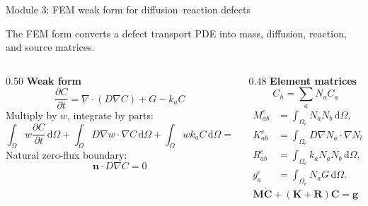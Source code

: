\documentclass[aspectratio=169,9pt]{beamer}
\newcommand{\dd}{\,\mathrm{d}}
\newcommand{\grad}{\nabla}
\newcommand{\divg}{\nabla\!\cdot}
\newcommand{\vect}[1]{\bm{#1}}
\newcommand{\mat}[1]{\mathbf{#1}}
\begin{document}
\begin{frame}{Module 3: FEM weak form for diffusion--reaction defects}
\footnotesize
\vspace{-3mm}
\begin{bluebox}
\centering
The FEM form converts a defect transport PDE into mass, diffusion, reaction, and source matrices.
\end{bluebox}

\vspace{1mm}
\begin{columns}[T,totalwidth=\textwidth]
\begin{column}{0.50\textwidth}
\textbf{Weak form}
\begin{equation*}
\frac{\partial C}{\partial t}=\divg(D\grad C)+G-k_aC
\end{equation*}
Multiply by \(w\), integrate by parts:
\begin{equation*}
\boxed{\int_\Omega w\frac{\partial C}{\partial t}\dd\Omega
+\int_\Omega D\grad w\cdot\grad C\dd\Omega
+\int_\Omega wk_aC\dd\Omega
=\int_\Omega wG\dd\Omega}
\end{equation*}
Natural zero-flux boundary:
\begin{equation*}
\boxed{\vect{n}\cdot D\grad C=0}
\end{equation*}
\end{column}
\begin{column}{0.48\textwidth}
\textbf{Element matrices}
\begin{equation*}
C_h=\sum_a N_a C_a
\end{equation*}
{\scriptsize
\begin{align*}
M^e_{ab}&=\int_{\Omega_e}N_aN_b\dd\Omega,\\
K^e_{ab}&=\int_{\Omega_e}D\grad N_a\cdot\grad N_b\dd\Omega,\\
R^e_{ab}&=\int_{\Omega_e}k_a N_aN_b\dd\Omega,\\
g^e_a&=\int_{\Omega_e}N_aG\dd\Omega.
\end{align*}}
\begin{equation*}
\boxed{\mat{M}\dot{\vect{C}}+(\mat{K}+\mat{R})\vect{C}=\vect{g}}
\end{equation*}
\end{column}
\end{columns}
\end{frame}
\end{document}
